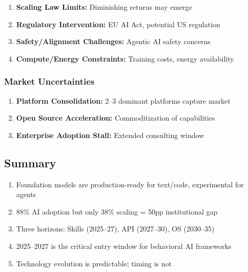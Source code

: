 \begin{enumerate}
    \item \textbf{Scaling Law Limits:} Diminishing returns may emerge
    \item \textbf{Regulatory Intervention:} EU AI Act, potential US regulation
    \item \textbf{Safety/Alignment Challenges:} Agentic AI safety concerns
    \item \textbf{Compute/Energy Constraints:} Training costs, energy availability
\end{enumerate}

\subsubsection{Market Uncertainties}

\begin{enumerate}
    \item \textbf{Platform Consolidation:} 2--3 dominant platforms capture market
    \item \textbf{Open Source Acceleration:} Commoditization of capabilities
    \item \textbf{Enterprise Adoption Stall:} Extended consulting window
\end{enumerate}


\subsection{Summary}

\begin{tcolorbox}[colback=gray!5!white, colframe=gray!75!black,
    title=\textbf{Summary: Appendix VVV.0 Key Points}]

\begin{enumerate}
    \item Foundation models are production-ready for text/code, experimental for agents
    \item 88\% AI adoption but only 38\% scaling = 50pp institutional gap
    \item Three horizons: Skills (2025--27), API (2027--30), OS (2030--35)
    \item 2025--2027 is the critical entry window for behavioral AI frameworks
    \item Technology evolution is predictable; timing is not
\end{enumerate}

\end{tcolorbox}


